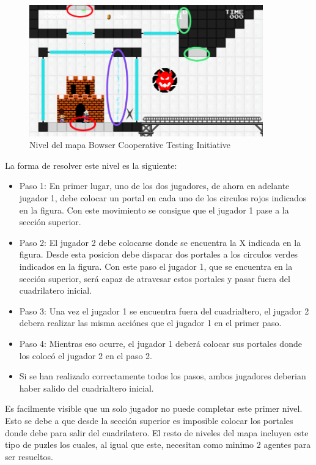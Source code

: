 \begin{figure}[ht]
    \centering
    \includegraphics[width=0.9\textwidth]{img/mario-1-level.png}
    \caption{Nivel del mapa Bowser Cooperative Testing Initiative \cite {mari0-mapa}}
    \label{fig:mapa}
\end{figure}

La forma de resolver este nivel es la siguiente:
\begin{itemize}
    \item Paso 1: En primer lugar, uno de los dos jugadores, de ahora en adelante jugador 1, debe colocar un portal en cada uno de los circulos rojos indicados en la figura. Con este movimiento se consigue que el jugador 1 pase a la sección superior.
    \item Paso 2: El jugador 2 debe colocarse donde se encuentra la X indicada en la figura. Desde esta posicion debe disparar dos portales a los circulos verdes indicados en la figura. Con este paso el jugador 1, que se encuentra en la sección superior, será capaz de atravesar estos portales y pasar fuera del cuadrilatero inicial.
    \item Paso 3: Una vez el jugador 1 se encuentra fuera del cuadrialtero, el jugador 2 debera realizar las misma acciónes que el jugador 1 en el primer paso.
    \item Paso 4: Mientras eso ocurre, el jugador 1 deberá colocar sus portales donde los colocó el jugador 2 en el paso 2.
    \item Si se han realizado correctamente todos los pasos, ambos jugadores deberian haber salido del cuadrialtero inicial.
\end{itemize}

Es facilmente visible que un solo jugador no puede completar este primer nivel. Esto se debe a que desde la sección superior es imposible colocar los portales donde debe para salir del cuadrilatero. El resto de niveles del mapa incluyen este tipo de puzles los cuales, al igual que este, necesitan como minimo 2 agentes para ser resueltos.